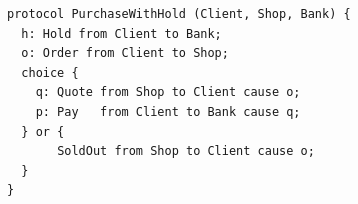 \begin{lstlisting}[language={}]
protocol PurchaseWithHold (Client, Shop, Bank) {
  h: Hold from Client to Bank;
  o: Order from Client to Shop;
  choice {
    q: Quote from Shop to Client cause o;
    p: Pay   from Client to Bank cause q;
  } or {
       SoldOut from Shop to Client cause o;
  }
}
\end{lstlisting}
